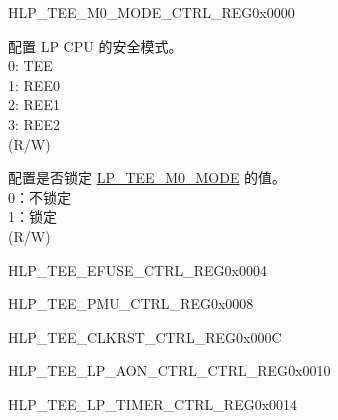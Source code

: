 \begin{register}{H}{LP\_TEE\_M0\_MODE\_CTRL\_REG}{0x0000}\label{regdesc:LPTEEM0MODECTRLREG}
%
%
%
\regnewline%
\begin{regdesc}\begin{reglist}
\label{fielddesc:LPTEEM0MODE}\item [LP\_TEE\_M0\_MODE] 配置 LP CPU 的安全模式。\\
0: TEE \\
1: REE0 \\
2: REE1 \\
3: REE2  \\ 
(R/W)
\label{fielddesc:LPTEEM0LOCK}\item [LP\_TEE\_M0\_LOCK] 配置是否锁定 \hyperref[fielddesc:LPTEEM0MODE]{LP\_TEE\_M0\_MODE} 的值。\\
0：不锁定\\
1：锁定  \\ 
(R/W)
\end{reglist}\end{regdesc}
\end{register}


\begin{register}{H}{LP\_TEE\_EFUSE\_CTRL\_REG}{0x0004}\label{regdesc:LPTEEEFUSECTRLREG}
\end{register}\vspace{-3em} 

\begin{register}{H}{LP\_TEE\_PMU\_CTRL\_REG}{0x0008}\label{regdesc:LPTEEPMUCTRLREG}
\end{register}\vspace{-3em}

\begin{register}{H}{LP\_TEE\_CLKRST\_CTRL\_REG}{0x000C}\label{regdesc:LPTEECLKRSTCTRLREG}
\end{register}\vspace{-3em} 

\begin{register}{H}{LP\_TEE\_LP\_AON\_CTRL\_CTRL\_REG}{0x0010}\label{regdesc:LPTEELPAONCTRLREG}
\end{register}\vspace{-3em} 

\begin{register}{H}{LP\_TEE\_LP\_TIMER\_CTRL\_REG}{0x0014}\label{regdesc:LPTEELPTIMERCTRLREG}
\end{register}\vspace{-3em} 

